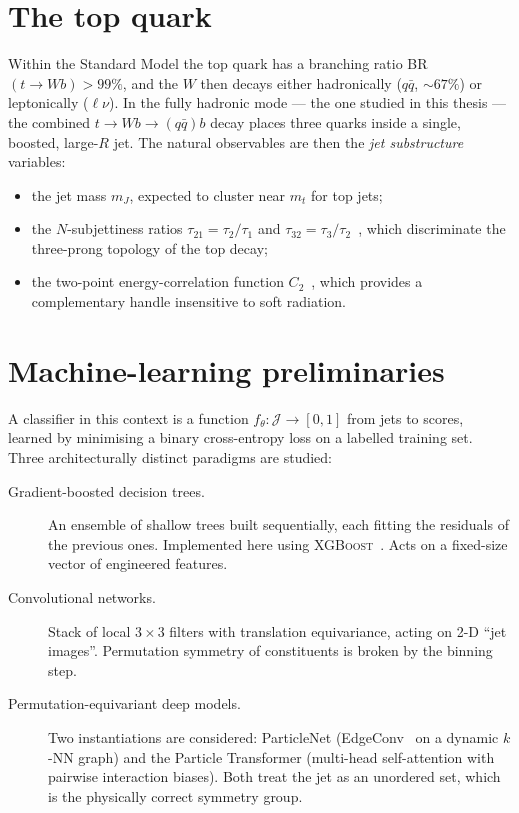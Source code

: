 \documentclass[12pt,a4paper,oneside]{report}
\begin{document}
\section{The top quark}
Within the Standard Model the top quark has a branching ratio
BR$(t\!\to\!Wb)>99\%$, and the $W$ then decays either hadronically
($q\bar q$, $\sim\!67\%$) or leptonically ($\ell\nu$).  In the
fully hadronic mode --- the one studied in this thesis --- the
combined $t\!\to\!Wb\!\to\!(q\bar q)b$ decay places three quarks
inside a single, boosted, large-$R$ jet.  The natural observables
are then the \emph{jet substructure} variables:
\begin{itemize}
    \item the jet mass $m_J$, expected to cluster near $m_t$ for
          top jets;
    \item the $N$-subjettiness ratios $\tau_{21}\!=\!\tau_2/\tau_1$
          and $\tau_{32}\!=\!\tau_3/\tau_2$~\cite{thaler}, which
          discriminate the three-prong topology of the top decay;
    \item the two-point energy-correlation function
          $C_2$~\cite{larkoski}, which provides a complementary
          handle insensitive to soft radiation.
\end{itemize}

\section{Machine-learning preliminaries}
A classifier in this context is a function $f_\theta:\mathcal{J}
\to[0,1]$ from jets to scores, learned by minimising a binary
cross-entropy loss on a labelled training set.  Three
architecturally distinct paradigms are studied:
\begin{description}
    \item[Gradient-boosted decision trees.]\quad An ensemble of
        shallow trees built sequentially, each fitting the
        residuals of the previous ones.  Implemented here using
        \textsc{XGBoost}~\cite{xgboost}.  Acts on a fixed-size
        vector of engineered features.
    \item[Convolutional networks.]\quad Stack of local
        $3\!\times\!3$ filters with translation equivariance, acting
        on 2-D ``jet images''.  Permutation symmetry of constituents
        is broken by the binning step.
    \item[Permutation-equivariant deep models.]\quad Two
        instantiations are considered: ParticleNet
        (EdgeConv~\cite{dgcnn} on a dynamic $k$-NN graph) and the
        Particle Transformer (multi-head self-attention with
        pairwise interaction biases).  Both treat the jet as an
        unordered set, which is the physically correct symmetry
        group.
\end{description}
\end{document}

